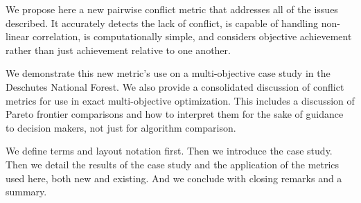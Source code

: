 We propose here a new pairwise conflict metric that addresses all of the issues described. It accurately detects the lack of conflict, is capable of handling non-linear correlation, is computationally simple, and considers objective achievement rather than just achievement relative to one another.

We demonstrate this new metric's use on a multi-objective case study in the Deschutes National Forest. We also provide a consolidated discussion of conflict metrics for use in exact multi-objective optimization. This includes a discussion of Pareto frontier comparisons and how to interpret them for the sake of guidance to decision makers, not just for algorithm comparison.

We define terms and layout notation first. Then we introduce the case study. Then we detail the results of the case study and the application of the metrics used here, both new and existing. And we conclude with closing remarks and a summary.
